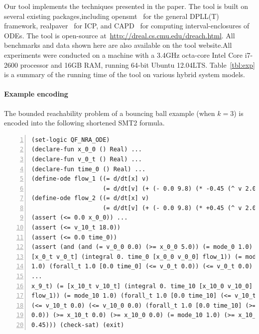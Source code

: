 Our tool \dReach{} implements the techniques presented in the
paper. The tool is built on several existing packages,including {\sf
  opensmt}~\cite{DBLP:conf/tacas/BruttomessoPST10} for the general
DPLL(T) framework, {\sf
  realpaver}~\cite{DBLP:journals/toms/GranvilliersB06} for ICP, and
{\sf CAPD}~\cite{capd} for computing interval-enclosures of ODEs. The
tool is open-source at~\url{http://dreal.cs.cmu.edu/dreach.html}. All
benchmarks and data shown here are also available on the tool
website.All experiments were conducted on a machine with a 3.4GHz
octa-core Intel Core i7-2600 processor and 16GB RAM, running 64-bit
Ubuntu 12.04LTS. Table~\ref{tbl:exp} is a summary of the running time
of the tool on various hybrid system models.

\paragraph{Example encoding} The bounded reachability problem of a
bouncing ball example (when $k = 3$) is encoded into the following
shortened SMT2 formula.
\begin{Verbatim}[fontfamily=courier, frame=single, framesep=1mm,  numbers=left, fontsize=\scriptsize]
(set-logic QF_NRA_ODE)
(declare-fun x_0_0 () Real) ...
(declare-fun v_0_t () Real) ...
(declare-fun time_0 () Real) ...
(define-ode flow_1 ((= d/dt[x] v)
                    (= d/dt[v] (+ (- 0.0 9.8) (* -0.45 (^ v 2.0))))))
(define-ode flow_2 ((= d/dt[x] v)
                    (= d/dt[v] (+ (- 0.0 9.8) (* +0.45 (^ v 2.0))))))
(assert (<= 0.0 x_0_0)) ...
(assert (<= v_10_t 18.0))
(assert (<= 0.0 time_0))
(assert (and (and (= v_0_0 0.0) (>= x_0_0 5.0)) (= mode_0 1.0) (=
[x_0_t v_0_t] (integral 0. time_0 [x_0_0 v_0_0] flow_1)) (= mode_0
1.0) (forall_t 1.0 [0.0 time_0] (<= v_0_t 0.0)) (<= v_0_t 0.0) (<=
...
x_9_t) (= [x_10_t v_10_t] (integral 0. time_10 [x_10_0 v_10_0]
flow_1)) (= mode_10 1.0) (forall_t 1.0 [0.0 time_10] (<= v_10_t 0.0))
(<= v_10_t 0.0) (<= v_10_0 0.0) (forall_t 1.0 [0.0 time_10] (>= x_10_t
0.0)) (>= x_10_t 0.0) (>= x_10_0 0.0) (= mode_10 1.0) (>= x_10_t
0.45))) (check-sat) (exit)
\end{Verbatim}

